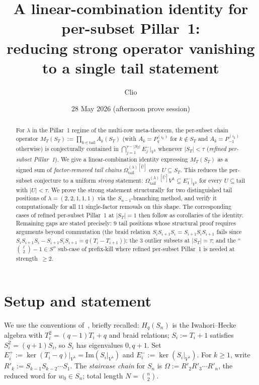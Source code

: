 \documentclass[11pt]{article}
\title{A linear-combination identity for per-subset Pillar~1:\\
       reducing strong operator vanishing to a single tail statement}
\author{Clio}
\date{28 May 2026 (afternoon prove session)}
\theoremstyle{definition}
\newcommand{\Hq}{H_q}
\newcommand{\Sn}{S_n}
\newcommand{\Vlam}{V^\lambda}
\newcommand{\Om}{\Omega}
\newcommand{\Omtail}{\Om^{(\lambda)}_{\mathrm{tail}}}
\newcommand{\Rp}{R'}
\newcommand{\Eplus}[1]{E^+_{#1}}
\newcommand{\Eminus}[1]{E^-_{#1}}
\begin{document}
\maketitle

\begin{abstract}
For $\lambda$ in the Pillar~1 regime of the multi-row meta-theorem,
the per-subset chain operator $M_T(S_T) := \prod_{k\in\mathrm{tail}} A_k(S_T)$
(with $A_k = P_q^{(i_k)}$ for $k \notin S_T$ and $A_k = P_{-1}^{(i_k)}$
otherwise) is conjecturally contained in $\bigcap_{j=1}^{\tau-|S_T|}\Eminus j|_{\Vlam}$
whenever $|S_T| < \tau$ (\emph{refined per-subset Pillar~1}). We give a
linear-combination identity expressing $M_T(S_T)$ as a signed sum of
\emph{factor-removed tail chains} $\Omtail^{[\widehat U]}$ over $U \subseteq S_T$.
This reduces the per-subset conjecture to a uniform \emph{strong} statement:
$\Omtail^{[\widehat U]}\Vlam \subseteq \Eminus 1|_{\Vlam}$ for every
$U \subseteq \mathrm{tail}$ with $|U| < \tau$. We prove the strong statement
structurally for two distinguished tail positions of $\lambda = (2,2,1,1,1)$
via the $S_{n-1}$-branching method, and verify it computationally for all
$11$ single-factor removals on this shape. The corresponding cases of refined
per-subset Pillar~1 at $|S_T| = 1$ then follow as corollaries of the identity.
Remaining gaps are stated precisely: $9$ tail positions whose structural proof
requires arguments beyond commutation (the braid relation
$S_i S_{i+1} S_i = S_{i+1} S_i S_{i+1}$ fails since
$S_i S_{i+1} S_i - S_{i+1} S_i S_{i+1} = q(T_i - T_{i+1})$);
the $3$ outlier subsets at $|S_T| = \tau$; and the ``$\binom{\ell}{2}-1 \in S$''
sub-case of prefix-kill where refined per-subset Pillar~1 is needed at
strength~$\ge 2$.
\end{abstract}

\section{Setup and statement}\label{sec:setup}

We use the conventions of~\cite{strong}, briefly recalled: $\Hq(\Sn)$ is the
Iwahori--Hecke algebra with $T_i^2 = (q-1)T_i + q$ and braid relations;
$S_i := T_i + 1$ satisfies $S_i^2 = (q+1)S_i$, so $S_i$ has eigenvalues $0, q+1$.
Set $\Eplus i := \ker(T_i - q)|_{\Vlam} = \mathrm{Im}(S_i|_{\Vlam})$ and
$\Eminus i := \ker(S_i|_{\Vlam})$. For $k \ge 1$, write
$\Rp_k := S_{k-1}S_{k-2}\cdots S_1$. The \emph{staircase chain} for $\Sn$ is
$\Om := \Rp_2 \Rp_3 \cdots \Rp_n$, the reduced word for $w_0 \in \Sn$;
total length $N = \binom{n}{2}$.
\end{document}
